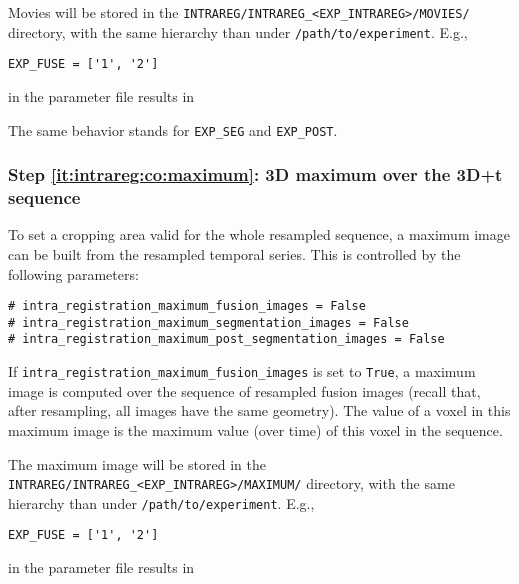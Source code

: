 Movies will be stored in the
\texttt{INTRAREG/INTRAREG\_<EXP\_INTRAREG>/MOVIES/} directory, with the same
hierarchy than under \texttt{/path/to/experiment}. E.g., 
\begin{verbatim}
EXP_FUSE = ['1', '2']
\end{verbatim}
in the parameter file results in

\mbox{}
\mbox{}

The same behavior stands for \texttt{EXP\_SEG} and  \texttt{EXP\_POST}.

\subsubsection{Step \ref{it:intrareg:co:maximum}: 3D maximum over the 3D+t sequence}
\label{sec:cli:intraregistration:maximum}

To set a cropping area valid for the whole resampled sequence, a maximum image can be built from the resampled temporal series. This is controlled by the following parameters:
\begin{verbatim}
# intra_registration_maximum_fusion_images = False
# intra_registration_maximum_segmentation_images = False
# intra_registration_maximum_post_segmentation_images = False
\end{verbatim}

If \verb|intra_registration_maximum_fusion_images| is set to \verb|True|, a maximum image is computed over the sequence of resampled fusion images (recall that, after resampling, all images have the same geometry). The value of a voxel in this maximum image is the maximum value (over time) of this voxel in the sequence.


The maximum image will be stored in the
\texttt{INTRAREG/INTRAREG\_<EXP\_INTRAREG>/MAXIMUM/} directory, with the same
hierarchy than under \texttt{/path/to/experiment}. E.g., 
\begin{verbatim}
EXP_FUSE = ['1', '2']
\end{verbatim}
in the parameter file results in

\mbox{}
\mbox{}

